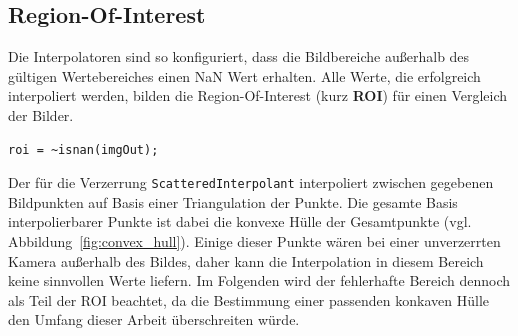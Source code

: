 \subsection{Region-Of-Interest}
\label{sec:roi}
Die Interpolatoren sind so konfiguriert, dass die Bildbereiche außerhalb des gültigen Wertebereiches einen NaN Wert erhalten. Alle Werte, die erfolgreich interpoliert werden, bilden die Region-Of-Interest (kurz \textbf{ROI}) für einen Vergleich der Bilder.
\begin{lstlisting}[style=Matlab-editor,basicstyle=\mlttfamily]
%% Bestimmung der Region of Interest für Entzerrung
roi = ~isnan(imgOut);
\end{lstlisting}
Der für die Verzerrung \texttt{ScatteredInterpolant} interpoliert zwischen gegebenen Bildpunkten auf Basis einer Triangulation der Punkte. Die gesamte Basis interpolierbarer Punkte ist dabei die konvexe Hülle der Gesamtpunkte (vgl. Abbildung~\ref{fig:convex_hull}). Einige dieser Punkte wären bei einer unverzerrten Kamera außerhalb des Bildes, daher kann die Interpolation in diesem Bereich keine sinnvollen Werte liefern. Im Folgenden wird der fehlerhafte Bereich dennoch als Teil der ROI beachtet, da die Bestimmung einer passenden konkaven Hülle den Umfang dieser Arbeit überschreiten würde.
